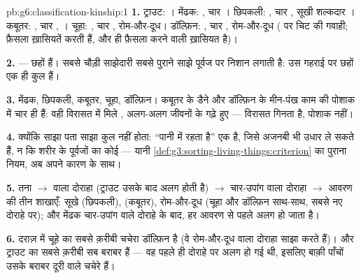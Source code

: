 \begin{solution}{pb:g6:classification-kinship:1}
\textbf{1.} ट्राउट: । मेंढक: , चार । छिपकली: , चार
, सूखी शल्कदार । कबूतर: , चार , । चूहा: , चार
, रोम-और-दूध। डॉल्फ़िन: , चार , रोम-और-दूध ( पर चिट की
गवाही; फ़ैसला ख़ासियतें करती हैं, और  ही फ़ैसला करने वाली ख़ासियत
है)।

\textbf{2.}  --- छहों  हैं। सबसे चौड़ी साझेदारी सबसे पुराने
साझे पूर्वज पर निशान लगाती है: उस गहराई पर छहों एक ही कुल हैं।

\textbf{3.} मेंढक, छिपकली, कबूतर, चूहा, डॉल्फ़िन। कबूतर के डैने और
डॉल्फ़िन के मीन-पंख काम की पोशाक में चार  ही हैं: वही विरासत में
मिले , अलग-अलग जीवनों के गढ़े हुए ---  विरासत गिनता है,
पोशाक नहीं।

\textbf{4.} क्योंकि साझा पता साझा कुल नहीं होता: ``पानी में रहता है''
एक  है, जिसे अजनबी भी उधार ले सकते हैं, न कि शरीर के पूर्वजों का
कोई  --- यानी
\cref{def:g3:sorting-living-things:criterion} का पुराना नियम, अब अपने
कारण के साथ।

\textbf{5.} तना $\rightarrow$  वाला दोराहा (ट्राउट उसके बाद अलग
होती है) $\rightarrow$ चार-उपांग वाला दोराहा $\rightarrow$ आवरण की तीन
शाखाएँ: सूखे  (छिपकली),  (कबूतर), रोम-और-दूध (चूहा और डॉल्फ़िन
साथ-साथ, सबसे नए दोराहे पर); और मेंढक चार-उपांग वाले दोराहे के बाद, हर
आवरण से पहले अलग हो जाता है।

\textbf{6.} दराज़ में चूहे का सबसे क़रीबी चचेरा डॉल्फ़िन है (वे
रोम-और-दूध वाला दोराहा साझा करते हैं)। और ट्राउट का सबसे क़रीबी सब
बराबर हैं --- वह पहले ही दोराहे पर अलग हो गई थी, इसलिए बाक़ी पाँचों
उसके बराबर दूरी वाले चचेरे हैं।


\end{solution}
